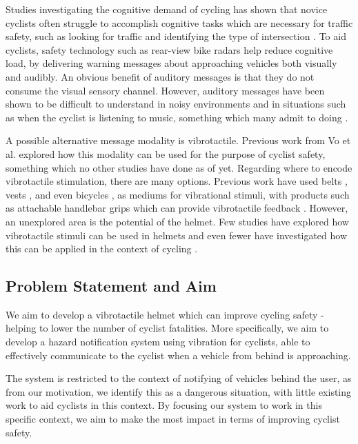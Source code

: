 \documentclass{mpaper}
\begin{document}
Studies investigating the cognitive demand of cycling has shown that novice cyclists often struggle to accomplish cognitive tasks which are necessary for traffic safety, such as looking for traffic and identifying the type of intersection \cite{https://doi.org/10.1002/acp.2350050205}. To aid cyclists, safety technology such as rear-view bike radars \cite{garminradar} help reduce cognitive load, by delivering warning messages about approaching vehicles both visually and audibly. An obvious benefit of auditory messages is that they do not consume the visual sensory channel. However, auditory messages have been shown to be difficult to understand in noisy environments \cite{noisyenv} and in situations such as when the cyclist is listening to music, something which many admit to doing \cite{DEWAARD2011626}.

A possible alternative message modality is vibrotactile. Previous work from Vo et al. \cite{10.1145/3411763.3451580} explored how this modality can be used for the purpose of cyclist safety, something which no other studies have done as of yet. Regarding where to encode vibrotactile stimulation, there are many options. Previous work have used belts \cite{10.1145/1613858.1613911, 10.1145/2449396.2449450, 10.1145/1060581.1060585}, vests \cite{729547, 998954, van2000tactile, 10.1145/2556288.2557404}, and even bicycles \cite{10.1145/2371574.2371631, 10.1145/3290605.3300850}, as mediums for vibrational stimuli, with products such as attachable handlebar grips which can provide vibrotactile feedback \cite{smartgrips}. However, an unexplored area is the potential of the helmet. Few studies have explored how vibrotactile stimuli can be used in helmets \cite{10.1007/978-3-642-39802-5_3, yamauchi2020vibro} and even fewer have investigated how this can be applied in the context of cycling \cite{krauss2021head}.
 

\subsection{Problem Statement and Aim}
We aim to develop a vibrotactile helmet which can improve cycling safety - helping to lower the number of cyclist fatalities. More specifically, we aim to develop a hazard notification system using vibration for cyclists, able to effectively communicate to the cyclist when a vehicle from behind is approaching. 

The system is restricted to the context of notifying of vehicles behind the user, as from our motivation, we identify this as a dangerous situation, with little existing work to aid cyclists in this context. By focusing our system to work in this specific context, we aim to make the most impact in terms of improving cyclist safety.
\end{document}
